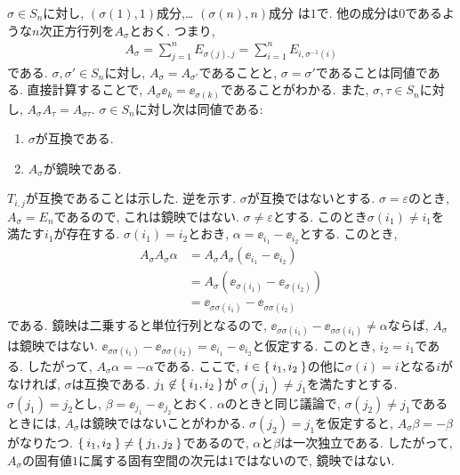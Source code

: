 \begin{example}
  $\sigma \in S_n$に対し,
  $(\sigma(1),1)$成分,\ldots
  $(\sigma(n),n)$成分
  は$1$で. 他の成分は$0$であるような$n$次正方行列を$A_\sigma$とおく.
  つまり,
  \begin{align*}
    A_\sigma = \sum_{j=1}^{n} E_{\sigma(j),j} = \sum_{i=1}^{n} E_{i,\sigma^{-1}(i)}
  \end{align*}
  である.
  $\sigma,\sigma'\in S_n$に対し, $A_\sigma=A_{\sigma'}$であることと,
  $\sigma=\sigma'$であることは同値である.
  直接計算することで,
  $A_\sigma \ee_k=\ee_{\sigma(k)}$であることがわかる.
  また,
  $\sigma,\tau\in S_n$に対し,
  $A_\sigma A_\tau = A_{\sigma\tau}$.
  $\sigma\in S_n$に対し次は同値である:
  \begin{enumerate}
  \item $\sigma$が互換である.
  \item $A_\sigma$が鏡映である.
  \end{enumerate}
  $T_{i,j}$が互換であることは示した.
  逆を示す.
  $\sigma$が互換ではないとする.
  $\sigma=\varepsilon$のとき, $A_\sigma=E_n$であるので, これは鏡映ではない.
  $\sigma\neq\varepsilon$とする.
  このとき$\sigma(i_1)\neq i_1$を満たす$i_1$が存在する.
  $\sigma(i_1)=i_2$とおき,
  $\alpha=\ee_{i_1}-\ee_{i_2}$とする.
  このとき,
  \begin{align*}
    A_\sigma A_\sigma\alpha
    &= A_\sigma A_\sigma (\ee_{i_1}-\ee_{i_2})\\
    &= A_\sigma(\ee_{\sigma(i_1)}-\ee_{\sigma(i_2)})\\
    &= \ee_{\sigma\sigma(i_1)}-\ee_{\sigma\sigma(i_2)}
  \end{align*}
  である. 鏡映は二乗すると単位行列となるので,
  $\ee_{\sigma\sigma(i_1)}-\ee_{\sigma\sigma(i_1)}\neq \alpha$ならば,
  $A_\sigma$は鏡映ではない.
  $\ee_{\sigma\sigma(i_1)}-\ee_{\sigma\sigma(i_2)}=\ee_{i_1}-\ee_{i_2}$と仮定する.
  このとき, $i_2=i_1$である.
  したがって,  $A_\sigma \alpha = -\alpha$である.
  ここで,
  $i\in \Set{i_1, i_2}$の他に$\sigma(i)=i$となる$i$がなければ, $\sigma$は互換である.
  $j_1\not\in \Set{i_1,i_2}$が
  $\sigma(j_1)\neq j_1$を満たすとする.
  $\sigma(j_1)=j_2$とし, $\beta=\ee_{j_1}-\ee_{j_2}$とおく.
  $\alpha$のときと同じ議論で,
  $\sigma(j_2)\neq j_1$であるときには, $A_\sigma$は鏡映ではないことがわかる.
  $\sigma(j_2)= j_1$を仮定すると, $A_\sigma \beta=-\beta$がなりたつ.
  $\Set{i_1,i_2}\neq \Set{j_1,j_2}$であるので,
  $\alpha$と$\beta$は一次独立である.
  したがって, $A_\sigma$の固有値$1$に属する固有空間の次元は$1$ではないので,
  鏡映ではない.
\end{example}

